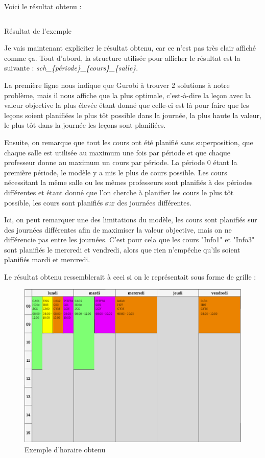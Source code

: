 Voici le résultat obtenu :

\begin{listing}[H]
\inputminted{java}{assets/figures/solutions.txt}
\caption{Résultat de l'exemple}
\end{listing}

Je vais maintenant expliciter le résultat obtenu, car ce n'est pas très clair affiché comme ça. Tout d'abord, la structure utilisée pour afficher le résultat est la suivante : \textit{sch\_\{période\}\_\{cours\}\_\{salle\}}.

La première ligne nous indique que Gurobi à trouver 2 solutions à notre problème, mais il nous affiche que la plus optimale, c'est-à-dire la leçon avec la valeur objective la plus élevée étant donné que celle-ci est là pour faire que les leçons soient planifiées le plus tôt possible dans la journée, la plus haute la valeur, le plus tôt dans la journée les leçons sont planifiées.

Ensuite, on remarque que tout les cours ont été planifié sans superposition, que chaque salle est utilisée au maximum une fois par période et que chaque professeur donne au maximum un cours par période. La période 0 étant la première période, le modèle y a mis le plus de cours possible. Les cours nécessitant la même salle ou les mêmes professeurs sont planifiés à des périodes différentes et étant donné que l'on cherche à planifier les cours le plus tôt possible, les cours sont planifiés sur des journées différentes.

Ici, on peut remarquer une des limitations du modèle, les cours sont planifiés sur des journées différentes afin de maximiser la valeur objective, mais on ne différencie pas entre les journées. C'est pour cela que les cours "Info1" et "Info3" sont planifiés le mercredi et vendredi, alors que rien n'empêche qu'ils soient planifiés mardi et mercredi.

Le résultat obtenu ressemblerait à ceci si on le représentait sous forme de grille :

\begin{figure}[H]
\centering
\includegraphics[width=1\textwidth]{./assets/figures/schedule.png}
\caption{Exemple d'horaire obtenu}
\end{figure}